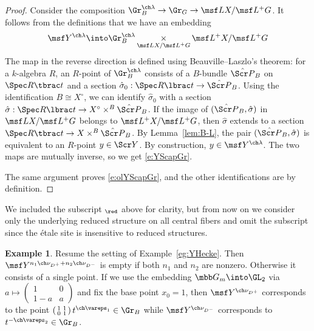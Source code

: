\documentclass[final]{amsart}
\theoremstyle{remark}
\theoremstyle{definition}
\newtheorem{eg}[subsubsection]{Example}
\DeclareMathOperator*{\xt}{\times}
\numberwithin{equation}{section}
\begin{document}
\begin{proof}
Consider the composition $\Gr_B^{\ch\lambda} \to  \Gr_G \to \msf L X/\msf L^+G$. 
It follows from the definitions that we have an embedding
\[  \msf Y^{\ch\lambda} \into \Gr^{\ch\lambda}_B \xt_{\msf L X/\msf L^+G} \msf L^+X/\msf L^+G
\]
The map in the reverse direction is defined using Beauville--Laszlo's theorem: for a $k$-algebra $R$, an $R$-point of $\Gr^{\ch\lambda}_B$ consists
of a $B$-bundle $\hat{\Scr P}_B$ on $\Spec R\tbrac t$ and a section 
$\hat\sigma_0 : \Spec R\lbrac t \to \hat{\Scr P}_B$. Using the
identification $B \cong X^\circ$, we can identify $\hat\sigma_0$
with a section $\hat\sigma: \Spec R\lbrac t \to X^\circ \times^B \hat{\Scr P}_B$. 
If the image of $(\hat{\Scr P}_B, \hat \sigma)$ in $\msf L X/\msf L^+G$ belongs to $\msf L^+X/\msf L^+G$, then 
$\hat\sigma$ extends to a section $\Spec R\tbrac t \to X\times^B \hat{\Scr P}_B$. 
By Lemma~\ref{lem:B-L}, the pair $(\hat{\Scr P}_B, \hat \sigma)$ is equivalent to an $R$-point $y\in \Scr Y$. 
By construction, $y\in \msf Y^{\ch\lambda}$.
The two maps are mutually inverse, so we get \eqref{e:YScapGr}.

The same argument proves \eqref{e:olYScapGr},
and the other identifications are by definition.
\end{proof}

We included the subscript $_\red$ above for clarity, but from now on we 
consider only the underlying reduced structure on all central fibers 
and omit the subscript since the \'etale site is insensitive
to reduced structures.

\begin{eg} \label{eg:Yfiber}
Resume the setting of Example~\ref{eg:YHecke}.  
Then $\msf Y^{n_1 \ch\nu_{D^+} + n_2 \ch\nu_{D^-}}$ is empty if both $n_1$ and $n_2$ are nonzero.
Otherwise it consists of a single point. 
 If we use the embedding $\mbb G_m \into \GL_2$
via $a\mapsto \left( \begin{smallmatrix} 1 & 0 \\ 1-a& a \end{smallmatrix}\right)$
and fix the base point $x_0=1$, then $\msf Y^{\ch\nu_{D^+}}$ 
corresponds to the point 
$\left( \begin{smallmatrix} 1 & 1 \\ 0 & 1 \end{smallmatrix} \right) t^{\ch\vareps_1} \in \Gr_B$ 
while $\msf Y^{\ch\nu_{D^-}}$ corresponds to $t^{-\ch\vareps_2} \in \Gr_B$.
\end{eg}
\end{document}
